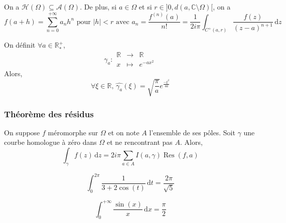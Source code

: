 
  \begin{corollary}
    On a $\mathcal{H}(\Omega) \subseteq \mathcal{A}(\Omega)$. De plus, si $a \in \Omega$ et si $r \in ]0, d(a,\mathbb{C}\setminus\Omega)[$, on a
    \[ f(a + h) = \sum_{n=0}^{+\infty} a_n h^n \text{ pour } \vert h \vert < r \text{ avec } a_n = \frac{f^{(n)}(a)}{n!} = \frac{1}{2i\pi} \int_{C^+(a,r)} \frac{f(z)}{(z-a)^{n+1}} \, \mathrm{d}z \]
  \end{corollary}


  \begin{application}
    On définit $\forall a \in \mathbb{R}^+_*$,
    \[ \gamma_a :
    \begin{array}{ccc}
      \mathbb{R} &\rightarrow& \mathbb{R} \\
      x &\mapsto& e^{-ax^2}
    \end{array}
    \]
    Alors,
    \[ \forall \xi \in \mathbb{R}, \, \widehat{\gamma_a}(\xi) = \sqrt{\frac{\pi}{a}} e^{\frac{- \xi^2}{4a}} \]
  \end{application}

  \subsubsection{Théorème des résidus}


  \begin{theorem}
    On suppose $f$ méromorphe sur $\Omega$ et on note $A$ l'ensemble de ses pôles. Soit $\gamma$ une courbe homologue à zéro dans $\Omega$ et ne rencontrant pas $A$. Alors,
    \[ \int_\gamma f(z) \, \mathrm{d}z = 2i\pi \sum_{a \in A} I(a, \gamma) \operatorname{Res}(f, a) \]
  \end{theorem}


  \begin{example}
    \[ \int_{0}^{2\pi} \frac{1}{3 + 2\cos(t)} \, \mathrm{d}t = \frac{2\pi}{\sqrt{5}} \]
  \end{example}

  \begin{example}
    \[ \int_{0}^{+\infty} \frac{\sin(x)}{x} \, \mathrm{d}x = \frac{\pi}{2} \]
  \end{example}

